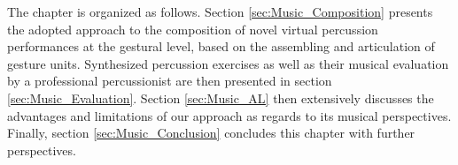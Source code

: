 The chapter is organized as follows. %
Section \ref{sec:Music_Composition} presents the adopted approach to the composition of novel virtual percussion performances at the gestural level, based on the assembling and articulation of gesture units. Synthesized percussion exercises as well as their musical evaluation by a professional percussionist are then presented in section \ref{sec:Music_Evaluation}. Section \ref{sec:Music_AL} then extensively discusses the advantages and limitations of our approach as regards to its musical perspectives. Finally, section \ref{sec:Music_Conclusion} concludes this chapter with further perspectives.









